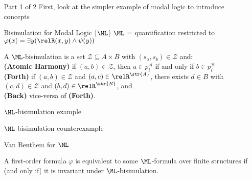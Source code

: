 \documentclass[169]{beamer}
\begin{document}
\begin{frame}{Part 1 of 2}
  First, look at the simpler example of modal logic to introduce concepts
\end{frame}

\begin{frame}{Bisimulation for Modal Logic ($\ML$)}
  $\ML$ = quantification restricted to $\varphi(x) = \exists{y} (\relR(x,y) \land \psi(y))$
  \vspace{1em}
  \begin{definition}
    A $\ML$-bisimulation is a set $\mathcal{Z} \subseteq A \times B$ with $(s_{a}, s_{b}) \in \mathcal{Z}$ and:\\[0.5em]
      \textbf{(Atomic Harmony)} if $(a,b) \in \mathcal{Z}$, then $a \in p_{i}^{\mathcal{A}}$ if and only if $b \in p_{i}^{\mathcal{B}}$\\[0.5em]
      \textbf{(Forth)} if $(a,b) \in \mathcal{Z}$ and $(a,c) \in \relR^{\str{A}}$, there exists $d \in B$ with $(c,d) \in \mathcal{Z}$ and $(b,d) \in \relR^{\str{B}}$, and\\[0.5em]
      \textbf{(Back)} vice-versa of \textbf{(Forth)}.
  \end{definition}
\end{frame}

\begin{frame}{$\ML$-bisimulation example}
  \begin{center}
    
  \end{center}
\end{frame}

\begin{frame}{$\ML$-bisimulation counterexample}
  \begin{center}
    
  \end{center}
\end{frame}

\begin{frame}{Van Benthem for $\ML$}
  \begin{theorem}
    A first-order formula $\varphi$ is equivalent to some $\ML$-formula over finite structures if (and only if) it is invariant under $\ML$-bisimulation.
  \end{theorem}
\end{frame}
\end{document}
